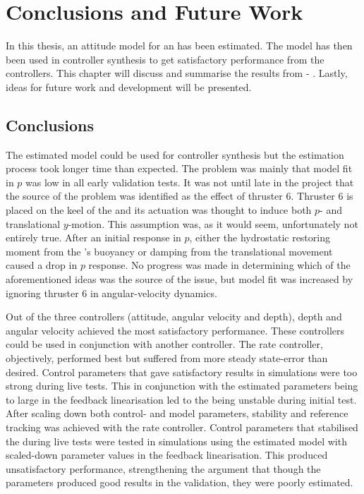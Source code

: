 \chapter{Conclusions and Future Work}\label{cha:conclusions}
In this thesis, an attitude model for an \abbrROV has been estimated. The model has then been used in controller synthesis to get satisfactory performance from the controllers. This chapter will discuss and summarise the results from  - . 
Lastly, ideas for future work and development will be presented.

\section{Conclusions}
The estimated model could be used for controller synthesis but the estimation process took longer time than expected. The problem was mainly that model fit in $p$ was low in all early validation tests. It was not until late in the project that the source of the problem was identified as the effect of thruster 6. Thruster 6 is  placed on the keel of the \abbrROV and its actuation was thought to induce both $p$- and translational $y$-motion. This assumption was, as it would seem, unfortunately not entirely true. After an initial response in $p$, either the hydrostatic restoring moment from the \abbrROV's buoyancy or damping from the translational movement caused a drop in $p$ response. No progress was made in determining which of the aforementioned ideas was the source of the issue, but model fit was increased by ignoring thruster 6 in angular-velocity dynamics.  

Out of the three controllers (attitude, angular velocity and depth), depth and angular velocity achieved the most satisfactory performance. These controllers could be used in conjunction with another controller. The rate controller, objectively, performed best but suffered from more steady state-error than desired. Control parameters that gave satisfactory results in simulations were too strong during live tests. This in conjunction with the estimated parameters being to large in the feedback linearisation led to the \abbrROV being unstable during initial test. After scaling down both control- and model parameters, stability and reference tracking was achieved with the rate controller. Control parameters that stabilised the \abbrROV during live tests were tested in simulations using the estimated model with scaled-down parameter values in the feedback linearisation. This produced unsatisfactory performance, strengthening the argument that though the parameters produced good results in the validation, they were poorly estimated.


